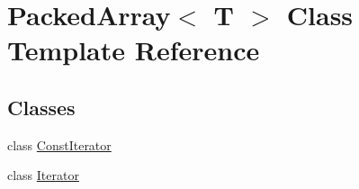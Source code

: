 \hypertarget{class_packed_array}{}\section{Packed\+Array$<$ T $>$ Class Template Reference}
\label{class_packed_array}
\subsection*{Classes}
\begin{DoxyCompactItemize}
\item 
class \hyperlink{class_packed_array_1_1_const_iterator}{Const\+Iterator}
\item 
class \hyperlink{class_packed_array_1_1_iterator}{Iterator}
\end{DoxyCompactItemize}
